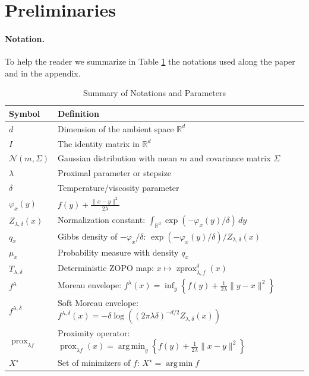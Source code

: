 \documentclass{article}
\newcommand{\prox}{\ensuremath{\operatorname{prox}}}
\newcommand{\zprox}{\ensuremath{\operatorname{zprox}}}
\DeclareMathOperator*{\argmin}{arg\,min}
\begin{document}
\appendix


\section{Preliminaries}

\paragraph{Notation.}

To help the reader we summarize in Table \ref{tab:notations} the notations used along the paper and in the appendix.

\begin{table}[ht]
\caption{Summary of Notations and Parameters}
\label{tab:notations}
\centering
\begin{tabular}{@{}ll@{}}
\toprule
\textbf{Symbol} & \textbf{Definition} \\ \midrule
$d$ & Dimension of the ambient space \(\mathbb{R}^d\) \\
$I$ & The identity matrix in \(\mathbb{R}^d\) \\
\(\mathcal N(m,\Sigma)\) & Gaussian distribution with mean \(m\) and covariance matrix \(\Sigma\) \\
\(\lambda\) & Proximal parameter or stepsize \\
\(\delta\) & Temperature/viscosity parameter \\
\(\varphi_x(y)\) & \(f(y) + \frac{\|x-y\|^2}{2\lambda}\) \\
\(Z_{\lambda,\delta}(x)\) & Normalization constant: \(\int_{\mathbb{R}^d} \exp(-\varphi_x(y)/\delta)\,dy\) \\
\(q_x\) & Gibbs density of \(-\varphi_x/\delta\): \(\exp(-\varphi_x(y)/\delta)/Z_{\lambda,\delta}(x)\) \\
\(\mu_x\) & Probability measure with density \(q_x\) \\
\(T_{\lambda,\delta}\) & Deterministic ZOPO map: \(x\mapsto \zprox^\delta_{\lambda,f}(x)\) \\
\(f^\lambda\) & Moreau envelope: \(f^\lambda(x)=\inf_y\left\{f(y)+\frac{1}{2\lambda}\|y-x\|^2\right\}\) \\
\(f^{\lambda,\delta}\) & Soft Moreau envelope: \(f^{\lambda,\delta}(x)=-\delta\log\left((2\pi\lambda\delta)^{-d/2}Z_{\lambda,\delta}(x)\right)\) \\
\(\prox_{\lambda f}\) & Proximity operator: \(\prox_{\lambda f}(x)=\argmin_y\left\{f(y)+\frac{1}{2\lambda}\|x-y\|^2\right\}\) \\
\(X^\star\) & Set of minimizers of \(f\): \(X^\star=\argmin f\) \\

\end{tabular}
\end{table}
\end{document}

